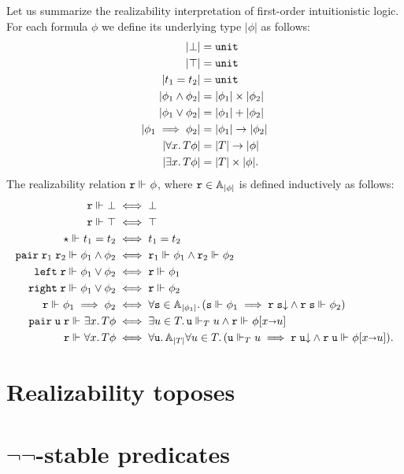 Let us summarize the realizability interpretation of first-order
intuitionistic logic. For each formula $\phi$ we define its underlying
type $|\phi|$ as follows:
%
\begin{align*}
  |\bot| &= \unit \\
  |\top| &= \unit \\
  |t_1 = t_2| &= \unit \\
  |\phi_1 \land \phi_2| &= |\phi_1| \times |\phi_2|\\
  |\phi_1 \lor \phi_2| &= |\phi_1| + |\phi_2|\\
  |\phi_1 \implies \phi_2| &= |\phi_1| \to |\phi_2|\\
  |\all{x}{\asm{T}}{\phi}| &= |T| \to |\phi| \\
  |\some{x}{\asm{T}}{\phi}| &= |T| \times |\phi|.
\end{align*}
%
The realizability relation $\R{r} \rz \phi$, where $\R{r} \in
\Atyp{|\phi|}$ is defined inductively as follows:
%
\begin{align*}
  \R{r} \rz \bot &\iff \bot\\
  \R{r} \rz \top &\iff \top\\
  \ttunit \rz t_1 = t_2 &\iff t_1 = t_2\\
  \combPair\;\R{r}_1\;\R{r}_2 \rz \phi_1 \land \phi_2 &\iff
  \R{r}_1 \rz \phi_1 \land \R{r}_2 \rz \phi_2\\
  \combLeft\;\R{r} \rz \phi_1 \lor \phi_2 &\iff \R{r} \rz \phi_1\\
  \combRight\;\R{r} \rz \phi_1 \lor \phi_2 &\iff \R{r} \rz \phi_2\\
  \R{r} \rz \phi_1 \implies \phi_2 &\iff
  \all{\R{s} \in \Atyp{|\phi_1|}} (\R{s} \rz \phi_1 \implies
    \defined{\R{r}\;\R{s}} \land \R{r}\;\R{s} \rz \phi_2)
  \\
  \combPair\;\R{u}\;\R{r} \rz \some{x}{\asm{T}}{\phi} &\iff
  \some{u \in T} \R{u} \rz[T] u \land \R{r} \rz \subst{\phi}{x \subto u}
  \\
  \R{r} \rz \all{x}{\asm{T}}{\phi} &\iff
  \all{\R{u}}{\Atyp{|T|}}{
    \all{u \in T}
      (\R{u} \rz[T] u \implies
      \defined{\R{r}\;\R{u}} \land \R{r}\;\R{u} \rz \subst{\phi}{x \subto u})
    }.
\end{align*}
%

\section{Realizability toposes}
\label{sec:realizability-toposes}


\section[\texorpdfstring{$\neg\neg$-stable predicates}{Not-not-stable predicates}]{$\neg\neg$-stable predicates}
\label{sec:decidable-predicates}

